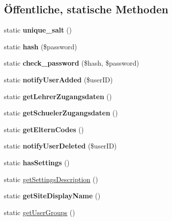 \subsection*{Öffentliche, statische Methoden}
\begin{DoxyCompactItemize}
\item 
\mbox{\label{classlogin_a4fa22c75b5a1eb9533e204fe22bedd63}} 
static {\bfseries unique\+\_\+salt} ()
\item 
\mbox{\label{classlogin_a19f5a630db1c4e4cfd1f7a086cf97e59}} 
static {\bfseries hash} (\$password)
\item 
\mbox{\label{classlogin_aed3ed716525360c6328d0e1ad0500340}} 
static {\bfseries check\+\_\+password} (\$hash, \$password)
\item 
\mbox{\label{classlogin_a14f2620a43a6088eb0dd39221a2ad9c6}} 
static {\bfseries notify\+User\+Added} (\$user\+ID)
\item 
\mbox{\label{classlogin_a70da03492deb4a0b3f6b62d36341f3d4}} 
static {\bfseries get\+Lehrer\+Zugangsdaten} ()
\item 
\mbox{\label{classlogin_a8fa1576a1cd4c6559e41b6445a03ffe4}} 
static {\bfseries get\+Schueler\+Zugangsdaten} ()
\item 
\mbox{\label{classlogin_a22b4f3f2fe36b1f2d5144df106564e34}} 
static {\bfseries get\+Eltern\+Codes} ()
\item 
\mbox{\label{classlogin_a05457e7a8ca67b7be87eecdea9764e3c}} 
static {\bfseries notify\+User\+Deleted} (\$user\+ID)
\item 
\mbox{\label{classlogin_afbb75408cc636558b4e22335446850cf}} 
static {\bfseries has\+Settings} ()
\item 
static \mbox{\hyperlink{classlogin_a72c5c4f3647e3756f3b8163e6cd308f2}{get\+Settings\+Description}} ()
\item 
\mbox{\label{classlogin_a97d798e919d64a0b6537f897313b2feb}} 
static {\bfseries get\+Site\+Display\+Name} ()
\item 
static \mbox{\hyperlink{classlogin_a7a98ec5a1152b564785795dcf0c8c214}{get\+User\+Groups}} ()

\end{DoxyCompactItemize}
